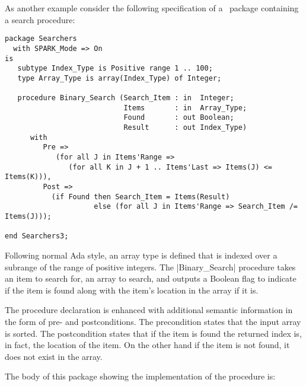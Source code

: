 As another example consider the following specification of a \SPARK\ package containing a search
procedure:

\begin{lstlisting}
package Searchers
  with SPARK_Mode => On
is
   subtype Index_Type is Positive range 1 .. 100;
   type Array_Type is array(Index_Type) of Integer;

   procedure Binary_Search (Search_Item : in  Integer;
                            Items       : in  Array_Type;
                            Found       : out Boolean;
                            Result      : out Index_Type)
      with
         Pre =>
            (for all J in Items'Range =>
               (for all K in J + 1 .. Items'Last => Items(J) <= Items(K))),
         Post =>
           (if Found then Search_Item = Items(Result)
                     else (for all J in Items'Range => Search_Item /= Items(J)));

end Searchers3;
\end{lstlisting}

Following normal Ada style, an array type is defined that is indexed over a subrange of the
range of positive integers. The |Binary_Search| procedure takes an item to search for, an array
to search, and outputs a Boolean flag to indicate if the item is found along with the item's
location in the array if it is.

The procedure declaration is enhanced with additional semantic information in the form of pre-
and postconditions. The precondition states that the input array is sorted. The postcondition
states that if the item is found the returned index is, in fact, the location of the item. On
the other hand if the item is not found, it does not exist in the array.

The body of this package showing the implementation of the procedure is:

